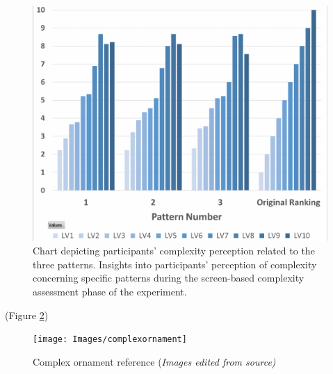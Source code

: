     \begin{figure}[htb]
        \centering
        \includegraphics[width=\linewidth]{Images/ComplexityPerceptionChart}
        \caption{Chart depicting participants' complexity perception related to the three patterns. Insights into participants' perception of complexity concerning specific patterns during the screen-based complexity assessment phase of the experiment.}
        \label{fig:ComplexityPerceptionChart}
    \end{figure}



(Figure \ref{fig:complexornament})

     \begin{figure}[htb]
          \centering
          \texttt{[image: Images/complexornament]}
          \caption{Complex ornament reference  (\textit{Images edited from source)}}
          \label{fig:complexornament}
        \end{figure}







